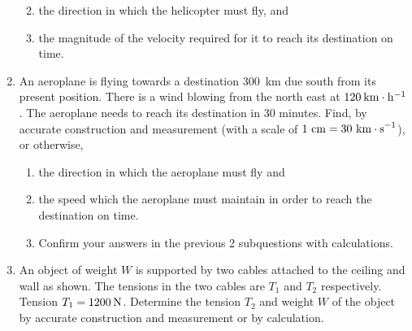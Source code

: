 \begin{enumerate}[noitemsep, label=\textbf{\arabic*}. ]
\begin{enumerate}[noitemsep, label=\textbf{\alph*}. ]
            \label{m38819*uid129}\item the direction in which the helicopter must fly, and
\label{m38819*uid130}\item the magnitude of the velocity required for it to reach its destination on time.
\end{enumerate}
                \label{m38819*uid131}\item An aeroplane is flying towards a destination 300~km due south from its present position. There is a wind blowing from the north east at \begin{math}120\phantom{\rule{2pt}{0ex}}\mathrm{km}\ensuremath{\cdot}\mathrm{h}{}^{-1}\end{math}. The aeroplane needs to reach its destination in 30 minutes. Find, by accurate construction and measurement (with a scale of \begin{math}1\phantom{\rule{3.33333pt}{0ex}}\mathrm{cm}=30\phantom{\rule{3.33333pt}{0ex}}{\mathrm{km}\ensuremath{\cdot}\mathrm{s}}^{-1}\end{math}), or otherwise,
\label{m38819*id198608}\begin{enumerate}[noitemsep, label=\textbf{\alph*}. ] 
            \label{m38819*uid132}\item the direction in which the aeroplane must fly and
\label{m38819*uid133}\item the speed which the aeroplane must maintain in order to reach the destination on time.
\label{m38819*uid134}\item Confirm your answers in the previous 2 subquestions with calculations.
\end{enumerate}
                \label{m38819*uid135}\item An object of weight \begin{math}W\end{math} is supported by two cables attached to the ceiling and wall as shown. The tensions in the two cables are \begin{math}{T}_{1}\end{math} and \begin{math}{T}_{2}\end{math} respectively. Tension \begin{math}{T}_{1}=1200\phantom{\rule{2pt}{0ex}}\mathrm{N}\end{math}. Determine the tension \begin{math}{T}_{2}\end{math} and weight \begin{math}W\end{math} of the object by accurate construction and measurement or by calculation.


\end{enumerate}
